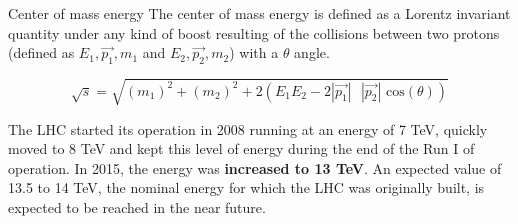 \documentclass[8pt]{beamer}
\begin{document}
\begin{frame}{Center of mass energy}
\justifying
The \alert{center of mass energy} is defined as a Lorentz invariant quantity under any kind of boost resulting of the collisions between two protons (defined as $E_1, \overrightarrow{p_1}, m_1$ and $E_2, \overrightarrow{p_2}, m_2$) with a $\theta$ angle. \vfill

\begin{equation*}
\sqrt{s} = \sqrt{(m_1)^2 + (m_2)^2 + 2 \left (E_1 E_2-2 |\overrightarrow{p_1}| \text{ } |\overrightarrow{p_2}| \text{ cos}(\theta) \right )}
\end{equation*} \vfill

The LHC started its operation in 2008 running at an energy of 7 TeV, quickly moved to 8 TeV
and kept this level of energy during the end of the Run I of operation. In 2015, the energy was \textbf{increased to 13 TeV}. \vfill
An expected value of 13.5 to 14 TeV, the nominal energy for which the LHC was originally built, is
expected to be reached in the near future. \vfill
\end{frame}
\end{document}

